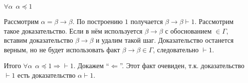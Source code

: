 \begin{enumerate}
\begin{enumerate}[wide, labelwidth=!, labelindent=0pt]
                    \(\forall \alpha \ \ \alpha \preceq 1\)

                    Рассмотрим \(\alpha = \beta \to \beta\). По построению \(1\) получается \(\beta \to \beta \vdash 1\). Рассмотрим такое доказательство. Если в нём используется \(\beta \to \beta\) с обоснованием \(\in\Gamma\), вставим доказательство \(\beta \to \beta\) и удалим такой шаг. Доказательство останется верным, но не будет использовать факт \(\beta \to \beta \in \Gamma\), следовательно \(\vdash 1\).

                    Итого \(\forall \alpha \ \ \alpha \preceq 1 \Rightarrow \vdash 1\). Докажем ``\( \Leftarrow \)''. Этот факт очевиден, т.к. доказательство \(\vdash 1\) есть доказательство \(\alpha \vdash 1\).
          \end{enumerate}
\end{enumerate}

